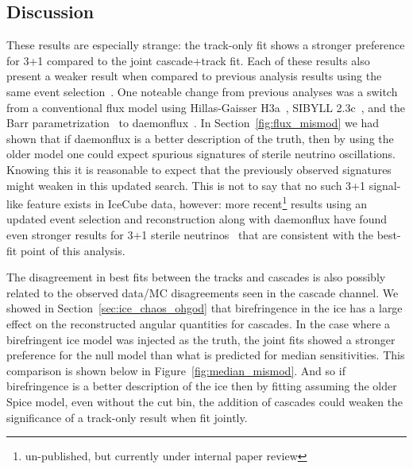 \documentclass[main.tex]{subfiles}
\begin{document}

\subsection{Discussion}

These results are especially strange: the track-only fit shows a stronger preference for 3+1 compared to the joint cascade+track fit. 
Each of these results also present a weaker result when compared to previous analysis results using the same event selection~\cite{Aartsen_2020, Aartsen_2020_prd}.
One noteable change from previous analyses was a switch from a conventional flux model using Hillas-Gaisser H3a~\cite{GAISSER2012801}, SIBYLL 2.3c~\cite{Riehn:2017mfm}, and the Barr parametrization~\cite{PhysRevD.74.094009} to daemonflux~\cite{yanez2023daemonflux}.
In Section~\ref{fig:flux_mismod} we had shown that if daemonflux is a better description of the truth, then by using the older model one could expect spurious signatures of sterile neutrino oscillations. 
Knowing this it is reasonable to expect that the previously observed signatures might weaken in this updated search. 
This is not to say that no such 3+1 signal-like feature exists in IceCube data, however: more recent\footnote{un-published, but currently under internal paper review} results using an updated event selection and reconstruction along with daemonflux have found even stronger results for 3+1 sterile neutrinos~\cite{alfonso_slides} that are consistent with the best-fit point of this analysis.

The disagreement in best fits between the tracks and cascades is also possibly related to the observed data/MC disagreements seen in the cascade channel. 
We showed in Section~\ref{sec:ice_chaos_ohgod} that birefringence in the ice has a large effect on the reconstructed angular quantities for cascades. 
In the case where a birefringent ice model was injected as the truth, the joint fits showed a stronger preference for the null model than what is predicted for median sensitivities. 
This comparison is shown below in Figure~\ref{fig:median_mismod}.
And so if birefringence is a better description of the ice then by fitting assuming the older Spice model, even without the cut bin, the addition of cascades could weaken the significance of a track-only result when fit jointly. 
\end{document}
